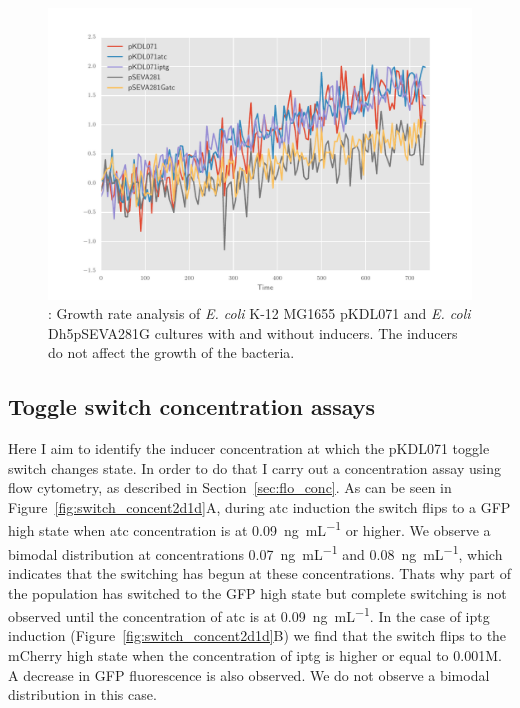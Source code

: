 \begin{figure}[htbp]
	\begin{center}
		\includegraphics[scale=0.7]{../../chapters/chapterABCFlow/images/growth_curves.pdf}
		\caption[LoF caption]{\label{fig:growth_curve}: Growth rate analysis of \textit{E. coli} K-12 MG1655 pKDL071 and \textit{E. coli} Dh5\textalpha pSEVA281G cultures with and without inducers. The inducers do not affect the growth of the bacteria. }
	\end{center}
\end{figure}

\clearpage

\subsection{Toggle switch concentration assays}

Here I aim to identify the inducer concentration at which the pKDL071 toggle switch changes state. In order to do that I carry out a concentration assay using flow cytometry, as described in Section~\ref{sec:flo_conc}. As can be seen in Figure~\ref{fig:switch_concent2d1d}A, during \acrshort{atc} induction the switch flips to a GFP high state when \acrshort{atc} concentration is at \SI{0.09}{\nano\gram\per\milli\liter} or higher. We observe a bimodal distribution at concentrations \SI{0.07}{\nano\gram\per\milli\liter} and \SI{0.08}{\nano\gram\per\milli\liter}, which indicates that the switching has begun at these concentrations. Thats why part of the population has switched to the GFP high state but complete switching is not observed until the concentration of \acrshort{atc} is at \SI{0.09}{\nano\gram\per\milli\liter}. In the case of \acrshort{iptg} induction (Figure~\ref{fig:switch_concent2d1d}B) we find that the switch flips to the mCherry high state when the concentration of \acrshort{iptg} is higher or equal to 0.001M. A decrease in GFP fluorescence is also observed. We do not observe a bimodal distribution in this case. 

